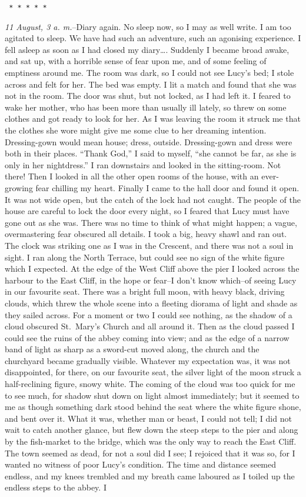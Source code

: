 \documentclass[12pt,openright]{book}
\begin{document}
\texttt{   *       *       *       *       *}

\textit{11 August, 3 a. m.}–Diary again. No sleep now, so I may as well write. I am too agitated to sleep. We have had such an adventure, such an agonising experience. I fell asleep as soon as I had closed my diary…. Suddenly I became broad awake, and sat up, with a horrible sense of fear upon me, and of some feeling of emptiness around me. The room was dark, so I could not see Lucy’s bed; I stole across and felt for her. The bed was empty. I lit a match and found that she was not in the room. The door was shut, but not locked, as I had left it. I feared to wake her mother, who has been more than usually ill lately, so threw on some clothes and got ready to look for her. As I was leaving the room it struck me that the clothes she wore might give me some clue to her dreaming intention. Dressing-gown would mean house; dress, outside. Dressing-gown and dress were both in their places. “Thank God,” I said to myself, “she cannot be far, as she is only in her nightdress.” I ran downstairs and looked in the sitting-room. Not there! Then I looked in all the other open rooms of the house, with an ever-growing fear chilling my heart. Finally I came to the hall door and found it open. It was not wide open, but the catch of the lock had not caught. The people of the house are careful to lock the door every night, so I feared that Lucy must have gone out as she was. There was no time to think of what might happen; a vague, overmastering fear obscured all details. I took a big, heavy shawl and ran out. The clock was striking one as I was in the Crescent, and there was not a soul in sight. I ran along the North Terrace, but could see no sign of the white figure which I expected. At the edge of the West Cliff above the pier I looked across the harbour to the East Cliff, in the hope or fear–I don’t know which–of seeing Lucy in our favourite seat. There was a bright full moon, with heavy black, driving clouds, which threw the whole scene into a fleeting diorama of light and shade as they sailed across. For a moment or two I could see nothing, as the shadow of a cloud obscured St. Mary’s Church and all around it. Then as the cloud passed I could see the ruins of the abbey coming into view; and as the edge of a narrow band of light as sharp as a sword-cut moved along, the church and the churchyard became gradually visible. Whatever my expectation was, it was not disappointed, for there, on our favourite seat, the silver light of the moon struck a half-reclining figure, snowy white. The coming of the cloud was too quick for me to see much, for shadow shut down on light almost immediately; but it seemed to me as though something dark stood behind the seat where the white figure shone, and bent over it. What it was, whether man or beast, I could not tell; I did not wait to catch another glance, but flew down the steep steps to the pier and along by the fish-market to the bridge, which was the only way to reach the East Cliff. The town seemed as dead, for not a soul did I see; I rejoiced that it was so, for I wanted no witness of poor Lucy’s condition. The time and distance seemed endless, and my knees trembled and my breath came laboured as I toiled up the endless steps to the abbey. I 
\end{document}
